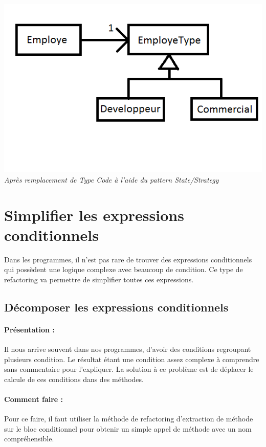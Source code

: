 \documentclass[a4paper,twoside,12pt,openright]{report}
\begin{document}
\begin{center}
\includegraphics[scale=1]{Image/TypeCode_State.png}\\
\itshape{Après remplacement de Type Code à l'aide du pattern State/Strategy}
\end{center}


\newpage
\section{Simplifier les expressions conditionnels}
Dans les programmes, il n'est pas rare de trouver des expressions conditionnels qui possèdent une logique complexe avec beaucoup de condition. Ce type de refactoring va permettre de simplifier toutes ces expressions.\\



\subsection{Décomposer les expressions conditionnels}
\paragraph{Présentation :}
Il nous arrive souvent dans nos programmes, d'avoir des conditions regroupant plusieurs condition. Le résultat étant une condition assez complexe à comprendre sans commentaire pour l'expliquer. La solution à ce problème est de déplacer le calcule de ces conditions dans des méthodes.

\paragraph{Comment faire :}
Pour ce faire, il faut utiliser la méthode de refactoring d'extraction de méthode sur le bloc conditionnel pour obtenir un simple appel de méthode avec un nom compréhensible.
\end{document}
